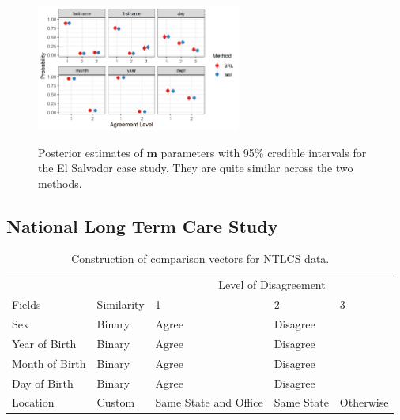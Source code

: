 \documentclass[ba]{imsart}
\begin{document}
	
	\begin{figure}[t]
		\begin{center}
                  	\includegraphics[width=0.6\textwidth]{../notes/figures/el_salvador/m_posterior_smallP} 
			\caption{Posterior estimates of $\bm{m}$ parameters with 95\% credible intervals for the El Salvador case study. They are quite similar across the two methods.}\label{fig:m-and-u}
			\label{fig:m-and-u}
		\end{center}
	\end{figure}
	
	\subsection{National Long Term Care Study}
	\label{nltcs}
	
	\begin{table}[t]
		\centering
		\begin{tabular}[t]{lllll}
			\multicolumn{2}{c}{ } & \multicolumn{3}{c}{Level of Disagreement} \\
			\cline{3-5}
			Fields & Similarity & 1 & 2 & 3\\
			\hline
			Sex & Binary & Agree & Disagree & \\
			Year of Birth & Binary & Agree & Disagree & \\
			Month of Birth & Binary & Agree & Disagree & \\
			Day of Birth & Binary & Agree & Disagree & \\
			Location & Custom & Same State and Office & Same State & Otherwise \\
			\hline
		\end{tabular}
		\caption{Construction of comparison vectors for NTLCS data.}\label{Tab:nltcs-comparisons}
	\end{table}
	
\end{document}

